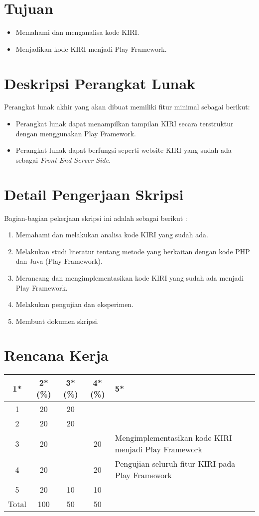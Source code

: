 \documentclass[a4paper,twoside]{article}
\begin{document}
\section{Tujuan}
\begin{itemize}
	\item Memahami dan menganalisa kode KIRI.
	\item Menjadikan kode KIRI menjadi Play Framework.
\end{itemize}

\section{Deskripsi Perangkat Lunak}
Perangkat lunak akhir yang akan dibuat memiliki fitur minimal sebagai berikut:
\begin{itemize}
	\item Perangkat lunak dapat menampilkan tampilan KIRI secara terstruktur dengan menggunakan Play Framework.
	\item Perangkat lunak dapat berfungsi seperti website KIRI yang sudah ada sebagai \textit{Front-End Server Side}.
\end{itemize}

\section{Detail Pengerjaan Skripsi}
Bagian-bagian pekerjaan skripsi ini adalah sebagai berikut :
	\begin{enumerate}
		\item Memahami dan melakukan analisa kode KIRI yang sudah ada.
		\item Melakukan studi literatur tentang metode yang berkaitan dengan kode PHP dan Java (Play Framework).
		\item Merancang dan mengimplementasikan kode KIRI yang sudah ada menjadi Play Framework.
		\item Melakukan pengujian dan eksperimen.
		\item Membuat dokumen skripsi.
	\end{enumerate}

\section{Rencana Kerja}
\begin{center}
  \begin{tabular}{ | c | c | c | c | l |}
    \hline
    1*  & 2*(\%) & 3*(\%) & 4*(\%) &5*\\ \hline \hline
    1   & 20  & 20  &  &  \\ \hline
    2   & 20 & 20  &   & \\ \hline
    3   & 20  &   & 20 & {\footnotesize Mengimplementasikan kode KIRI menjadi Play Framework}  \\ \hline
    4   & 20  &   &  20 & {\footnotesize Pengujian seluruh fitur KIRI pada Play Framework}\\ \hline
    5   & 20  & 10  & 10 &  \\ \hline
    Total  & 100  & 50  & 50 &  \\ \hline
                          \end{tabular}
\end{center}
\end{document}
